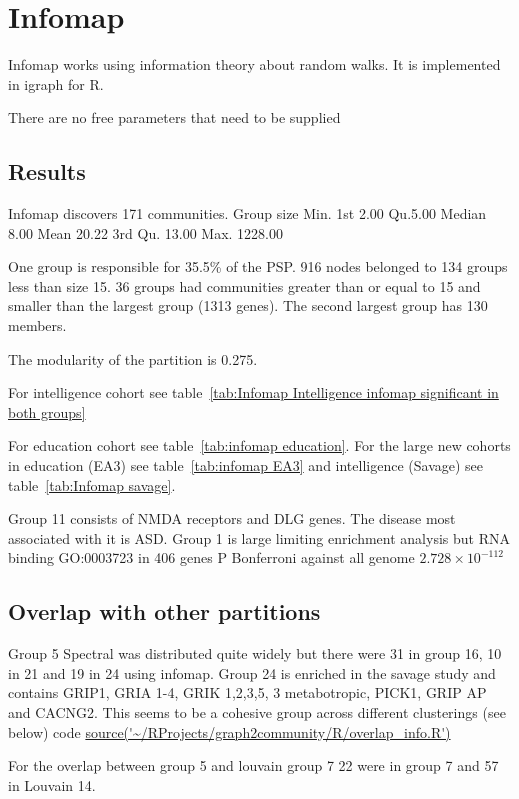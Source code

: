 \section{Infomap}

Infomap works using information theory about random walks. It is implemented in igraph for R. 

There are no free parameters that need to be supplied

\subsection{Results}

Infomap discovers 171 communities. Group size  Min. 1st 2.00 Qu.5.00   Median 8.00     Mean 20.22 3rd Qu. 13.00   Max. 1228.00

One group is responsible for 35.5\% of the PSP. 916 nodes belonged to 134 groups less than size 15. 36 groups had communities greater than or equal to 15 and smaller than the largest group (1313 genes). The second largest group has 130 members.  

The modularity of the partition is 0.275.


For intelligence cohort see table~\ref{tab:Infomap Intelligence infomap significant in both groups}

For education cohort see table~\ref{tab:infomap education}. For the large new cohorts in education (EA3) see table~\ref{tab:infomap EA3} and intelligence (Savage) see table~\ref{tab:Infomap savage}.

Group 11 consists of NMDA receptors and DLG genes. The disease most associated with it is ASD. Group 1 is large limiting enrichment analysis but RNA binding GO:0003723 in 406 genes P Bonferroni against all genome $2.728 \times 10^{-112}$ \subsection{Overlap with other partitions}

Group 5 Spectral was distributed quite widely but there were 31 in group 16, 10 in 21 and 19 in 24 using infomap. Group 24 is enriched in the savage study and contains GRIP1, GRIA 1-4, GRIK 1,2,3,5, 3 metabotropic, PICK1, GRIP AP and CACNG2. This seems to be a cohesive group across different clusterings (see below) code \url{source('~/RProjects/graph2community/R/overlap_info.R')}


For the overlap between group 5 and louvain group 7 22 were in group 7 and 57 in Louvain 14.

